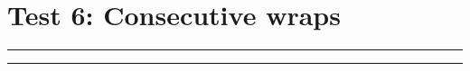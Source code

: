 \documentclass[11pt,a4paper]{article}
\begin{document}
\section{Test 6: Consecutive wraps}
\begin{simplewrap}%
  \begin{minipage}[t]{3cm}
    \centering
    \textcolor{cyan!60!black}{\rule{\linewidth}{3cm}}
  \end{minipage}%
\end{simplewrap}%
\lipsum[1]
\begin{simplewrap}%
  \begin{minipage}[t]{5cm}
    \centering
    \textcolor{yellow!80!black}{\rule{\linewidth}{4cm}}
  \end{minipage}%
\end{simplewrap}%
\lipsum[1]\lipsum[2]
\end{document}
